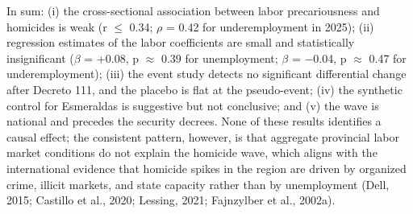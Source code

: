 In sum: (i) the cross-sectional association between labor precariousness and homicides is weak (r $\leq$ 0.34; $\rho$ = 0.42 for underemployment in 2025); (ii) regression estimates of the labor coefficients are small and statistically insignificant ($\beta$ = +0.08, p $\approx$ 0.39 for unemployment; $\beta$ = $-$0.04, p $\approx$ 0.47 for underemployment); (iii) the event study detects no significant differential change after Decreto 111, and the placebo is flat at the pseudo-event; (iv) the synthetic control for Esmeraldas is suggestive but not conclusive; and (v) the wave is national and precedes the security decrees. None of these results identifies a causal effect; the consistent pattern, however, is that aggregate provincial labor market conditions do not explain the homicide wave, which aligns with the international evidence that homicide spikes in the region are driven by organized crime, illicit markets, and state capacity rather than by unemployment (Dell, 2015; Castillo et al., 2020; Lessing, 2021; Fajnzylber et al., 2002a).